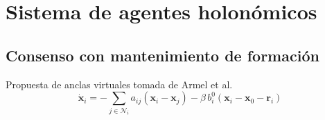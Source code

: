 \section{Sistema de agentes holonómicos}
\subsection{Consenso con mantenimiento de formación}
Propuesta de anclas virtuales tomada de Armel et al.~\cite{koulong2024distributed}
\begin{equation*}
    \dot{\mathbf{x}}_i = -\sum_{j \in \mathcal{N}_i} a_{ij}(\mathbf{x}_i - \mathbf{x}_j) - \beta\,b_i^0(\mathbf{x}_i - \mathbf{x}_0 - \mathbf{r}_i)
\end{equation*}
